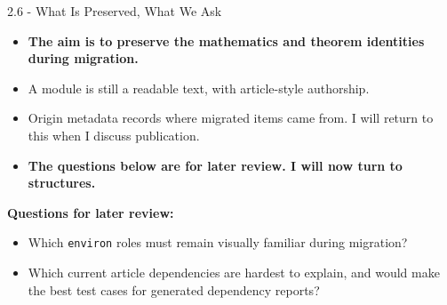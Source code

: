 \documentclass[aspectratio=169,11pt]{beamer}
\begin{document}
\begin{frame}[fragile,t]{2.6 - What Is Preserved, What We Ask}
\begin{itemize}
\setlength{\itemsep}{1pt}
\setlength{\parsep}{0pt}
\setlength{\parskip}{0pt}
\item \textcolor{blue!55!black}{\textbf{The aim is to preserve the mathematics and theorem identities during migration.}}
\item A module is still a readable text, with article-style authorship.
\item Origin metadata records where migrated items came from. I will return to this when I discuss publication.
\item \textcolor{blue!55!black}{\textbf{The questions below are for later review. I will now turn to structures.}}
\end{itemize}
\smallskip
\textbf{Questions for later review:}
\begin{itemize}
\setlength{\itemsep}{1pt}
\setlength{\parsep}{0pt}
\setlength{\parskip}{0pt}
\item Which \texttt{environ} roles must remain visually familiar during migration?
\item Which current article dependencies are hardest to explain, and would make the best test cases for generated dependency reports?
\end{itemize}
\end{frame}
\end{document}

